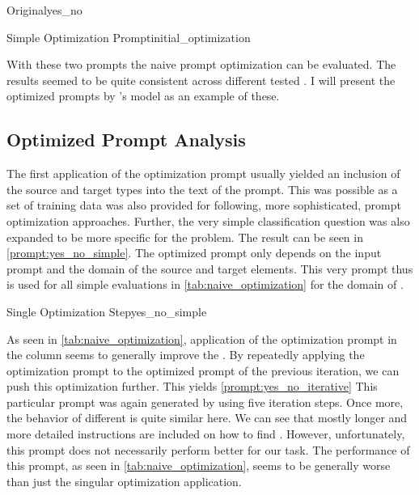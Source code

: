 \begin{prompt}{\KISS Original}{yes_no}
    \\
    
\end{prompt}

\begin{prompt}{Simple Optimization Prompt}{initial_optimization}
    \\
    
\end{prompt}

With these two prompts the naive prompt optimization can be evaluated.
The results seemed to be quite consistent across different tested \LLMs.
I will present the optimized prompts by \OAI's \gpt model as an example of these.

\subsection{Optimized Prompt Analysis}
\label{subsec:Evaluation:naive_optimization:optimized-prompt-analysis}
The first application of the optimization prompt usually yielded an inclusion of the source and target types into the text of the prompt.
This was possible as a set of training data was also provided for following, more sophisticated, prompt optimization approaches.
Further, the very simple classification question  was also expanded to be more specific for the \TLR problem.
The result can be seen in \autoref{prompt:yes_no_simple}.
The optimized prompt only depends on the input prompt and the domain of the source and target elements.
This very prompt thus is used for all simple \gpt evaluations in \autoref{tab:naive_optimization} for the domain of \RtR.

\begin{prompt}{\KISS Single Optimization Step}{yes_no_simple}
    \\
    
\end{prompt}

As seen in \autoref{tab:naive_optimization}, application of the optimization prompt in the column  seems to generally improve the \fone.
By repeatedly applying the optimization prompt to the optimized prompt of the previous iteration, we can push this optimization further.
This yields \autoref{prompt:yes_no_iterative}
This particular prompt was again generated by \gpt using five iteration steps.
Once more, the behavior of different \LLMs is quite similar here.
We can see that mostly longer and more detailed instructions are included on how to find \TLs.
However, unfortunately, this prompt does not necessarily perform better for our task.
The performance of this prompt, as seen in \autoref{tab:naive_optimization}, seems to be generally worse than just the singular optimization application.

